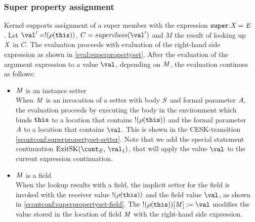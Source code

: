 \documentclass[a4paper,oneside]{article}
\begin{document}
\subsubsection{Super property assignment}
\label{subsubsec:super-property-assignemnt}

Kernel supports assignment of a super member with the expression $\tt{super}.\mathit{X}=\mathit{E}$.
Let $\val' = \deref{(\env(\this))}$, $C = \superclass{\val'}$ and $M$ the result of looking up $\mathit{X}$ in $C$.
The evaluation proceeds with evaluation of the right-hand side expression as shown in \eqref{eval:superpropertyset}.
After the evaluation of the argument expression to a value $\val$, depending on $\mathit{M}$, the evaluation continues as follows:

\begin{itemize}
    \item $\mathit{M}$ is an instance setter\\
        When $\mathit{M}$ is an invocation of a setter with body $\mathit{S}$ and formal parameter $A$, the evaluation proceeds by executing the body in the environment which binds $\tt{this}$ to a location that contains $!(\rho(\tt{this}))$ and the formal parameter $A$ to a location that contains $\val$.
        This is shown in the CESK-transition \eqref{econtconf:superpropertyset-setter}.
        Note that we add the special statement continuation $\ExitSK{\val_1}$, that will apply the value $\val$ to the current expression continuation.

    \item $\mathit{M}$ is a field\\
        When the lookup results with a field, the implicit setter for the field is invoked with the receiver value $!(\rho(\tt{this}))$ and the field value $\val$, as shown in \eqref{econtconf:superpropertyset-field}.
        The $\update{\deref{(\env(\this))}[\membermeta]}{\val}$ modifies the value stored in the location of field $\mathit{M}$ with the right-hand side expression.

\end{itemize}
\end{document}
